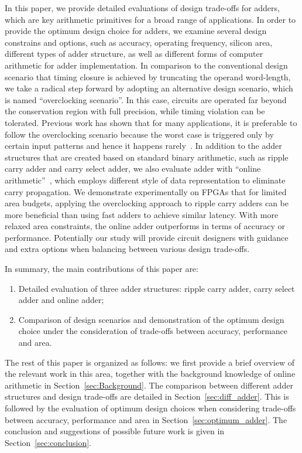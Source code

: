 \documentclass[10pt, conference, compsocconf]{IEEEtran}
\begin{document}
In this paper, we provide detailed evaluations of design trade-offs for adders, which are key arithmetic primitives for a broad range of applications. In order to provide the optimum design choice for adders, we examine several design constrains and options, such as accuracy, operating frequency, silicon area, different types of adder structure, as well as different forms of computer arithmetic for adder implementation. In comparison to the conventional design scenario that timing closure is achieved by truncating the operand word-length, we take a radical step forward by adopting an alternative design scenario, which is named ``overclocking scenario''. In this case, circuits are operated far beyond the conservation region with full precision, while timing violation can be tolerated. Previous work has shown that for many applications, it is preferable to follow the overclocking scenario because the worst case is triggered only by certain input patterns and hence it happens rarely~\cite{SKfccm13}. In addition to the adder structures that are created based on standard binary arithmetic, such as ripple carry adder and carry select adder, we also evaluate adder with ``online arithmetic''~\cite{Ercegovac_OnlineOverview}, which employs different style of data representation to eliminate carry propagation. We demonstrate experimentally on FPGAs that for limited area budgets, applying the overclocking approach to ripple carry adders can be more beneficial than using fast adders to achieve similar latency. With more relaxed area constraints, the online adder outperforms in terms of accuracy or performance. Potentially our study will provide circuit designers with guidance and extra options when balancing between various design trade-offs.

In summary, the main contributions of this paper are:
\begin{enumerate}
  \item Detailed evaluation of three adder structures: ripple carry adder, carry select adder and online adder;
  \item Comparison of design scenarios and demonstration of the optimum design choice under the consideration of trade-offs between accuracy, performance and area.
\end{enumerate}

The rest of this paper is organized as follows: we first provide a brief overview of the relevant work in this area, together with the background knowledge of online arithmetic in Section~\ref{sec:Background}. The comparison between different adder structures and design trade-offs are detailed in Section~\ref{sec:diff_adder}. This is followed by the evaluation of optimum design choices when considering trade-offs between accuracy, performance and area in Section~\ref{sec:optimum_adder}. The conclusion and suggestions of possible future work is given in Section~\ref{sec:conclusion}.
\end{document}
